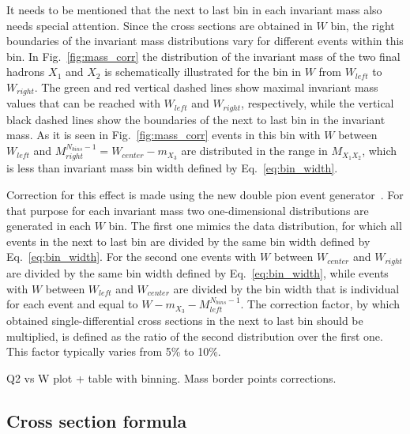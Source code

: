 \documentclass[prc,twocolumn,superscriptaddress,showpacs,amssymb,amsmath,amsfonts,linenumbers,aps]{revtex4-1}
\begin{document}
It needs to be mentioned that the next to last bin in each invariant mass also needs special attention. Since the cross sections are obtained in $W$ bin, the right boundaries of the invariant mass distributions vary for different events within this bin. In Fig.~\ref{fig:mass_corr} the distribution of the invariant mass of the two final hadrons $X_{1}$ and $X_{2}$ is schematically illustrated for the bin in $W$ from $W_{left}$ to $W_{right}$. 
The green and red vertical dashed lines show  maximal invariant mass values that can be reached with $W_{left}$ and $W_{right}$, respectively, while the vertical black dashed lines show the boundaries of the next to last bin in the invariant mass.
As it is seen in Fig.~\ref{fig:mass_corr} events in this bin with $W$ between $W_{left}$ and $M_{right}^{N_{bins}-1} = W_{center} - m_{X_{3}}$ are distributed in the range in $M_{X_{1}X_{2}}$, which is less than invariant mass bin width defined by Eq.~\ref{eq:bin_width}.

Correction for this effect is made using the new double pion event generator~\cite{Skorodum:EG}. For that purpose for each invariant mass two  one-dimensional distributions are generated in each $W$ bin. The first one mimics the data distribution, for which all events in the next to last bin are divided by the same bin width defined by Eq.~\ref{eq:bin_width}.  For the second one events with $W$ between $W_{center}$ and $W_{right}$ are divided by the same bin width defined by Eq.~\ref{eq:bin_width}, while events with $W$ between $W_{left}$ and $W_{center}$ are divided by the bin width that is individual for each event and equal to $W - m_{X_{3}} - M_{left}^{N_{bins}-1}$. The correction factor, by which obtained single-differential cross sections in the next to last bin should be multiplied, is defined as the ratio of the second distribution over the first one. This factor typically varies from 5\% to 10\%. 



Q2 vs W plot + table with binning.
Mass border points corrections.





















\subsection{Cross section formula}
\end{document}

